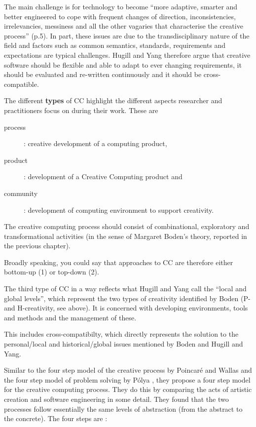The main challenge is for technology  to become ``more adaptive, smarter and better engineered to cope with frequent changes of direction, inconsistencies, irrelevancies, messiness and all the other vagaries that characterise the creative process'' (p.5). In part, these issues are due to the transdisciplinary nature of the field and factors such as common semantics, standards, requirements and expectations are typical challenges. Hugill and Yang therefore argue that creative software should be flexible and able to adapt to ever changing requirements, it should be evaluated and re-written continuously and it should be cross-compatible.

The different \textbf{types} of CC highlight the different aspects researcher and practitioners focus on during their work. These are

\begin{description}
  \item [process]:  creative development of a computing product,
  \item [product]: development of a Creative Computing product and
  \item [community]: development of computing environment to support creativity.
\end{description}

The creative computing process should consist of combinational, exploratory and transformational activities (in the sense of Margaret Boden’s theory, reported in the previous chapter).

\begin{draft}
  Broadly speaking, you could say that approaches to CC are therefore either bottom-up (1) or top-down (2).
\end{draft}

The third type of CC in a way reflects what Hugill and Yang call the ``local and global levels'', which represent the two types of creativity identified by Boden (P- and H-creativity, see above). It is concerned with developing environments, tools and methods and the management of these.

\begin{draft}
  This includes cross-compatibilty, which directly represents the solution to the personal/local and historical/global issues mentioned by Boden and Hugill and Yang.
\end{draft}

Similar to the four step model of the creative process by Poincaré and Wallas \citep{Poincare2001, Wallas1926} and the four step model of problem solving by Pólya \citep{Polya1957}, they propose a four step model for the creative computing process. They do this by comparing the acts of artistic creation and software engineering in some detail. They found that the two processes follow essentially the same levels of abstraction (from the abstract to the concrete). The four steps are \citep[p.15]{Polya1957}:

